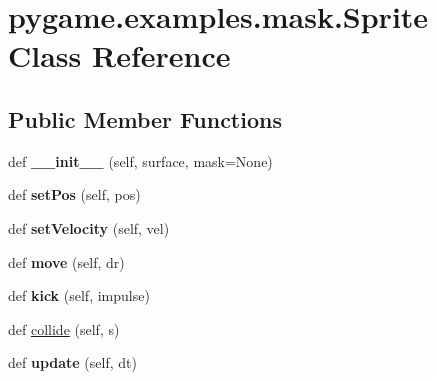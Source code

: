 \hypertarget{classpygame_1_1examples_1_1mask_1_1_sprite}{}\section{pygame.\+examples.\+mask.\+Sprite Class Reference}
\label{classpygame_1_1examples_1_1mask_1_1_sprite}
\subsection*{Public Member Functions}
\begin{DoxyCompactItemize}
\item 
\mbox{\label{classpygame_1_1examples_1_1mask_1_1_sprite_ae6686d07fd06285579fe1e904de45732}} 
def {\bfseries \+\_\+\+\_\+init\+\_\+\+\_\+} (self, surface, mask=None)
\item 
\mbox{\label{classpygame_1_1examples_1_1mask_1_1_sprite_a68dac6d891795254bd4b745f6ebeaca1}} 
def {\bfseries set\+Pos} (self, pos)
\item 
\mbox{\label{classpygame_1_1examples_1_1mask_1_1_sprite_a09d0692be80420d14ac1d599a7283ff2}} 
def {\bfseries set\+Velocity} (self, vel)
\item 
\mbox{\label{classpygame_1_1examples_1_1mask_1_1_sprite_afe08baeeea3d51ef17b3f1a26990d23d}} 
def {\bfseries move} (self, dr)
\item 
\mbox{\label{classpygame_1_1examples_1_1mask_1_1_sprite_a916bd550f8a757a460bbe3f85b1511ad}} 
def {\bfseries kick} (self, impulse)
\item 
def \hyperlink{classpygame_1_1examples_1_1mask_1_1_sprite_a34b356ed777771ec89a1e474341d8484}{collide} (self, s)
\item 
\mbox{\label{classpygame_1_1examples_1_1mask_1_1_sprite_aa9d40e7a74ad03dbb3785a3f05ad5639}} 
def {\bfseries update} (self, dt)
\end{DoxyCompactItemize}
